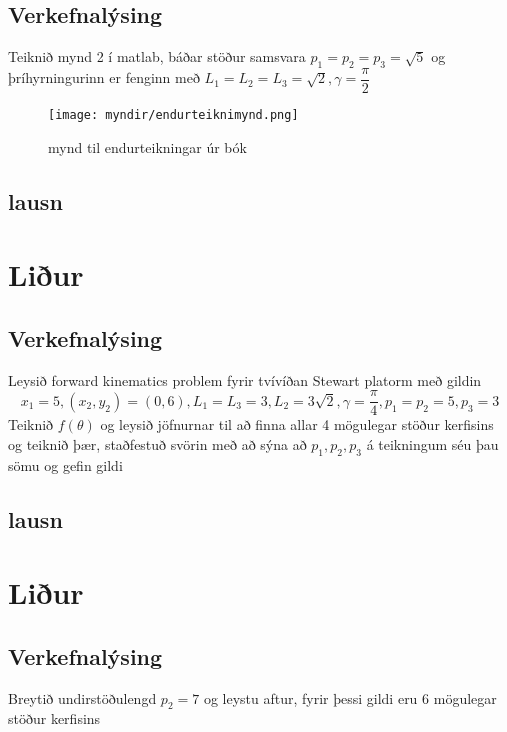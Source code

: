\documentclass[11pt]{article}   %
\numberwithin{equation}{section} %
\begin{document}
\subsection{Verkefnalýsing}
Teiknið mynd 2 í matlab, báðar stöður samsvara $p_1=p_2=p_3=\sqrt{5}$ og þríhyrningurinn er fenginn með $L_1=L_2=L_3=\sqrt{2},\gamma=\dfrac{\pi}{2}$

\begin{figure}[ht!]
\texttt{[image: myndir/endurteiknimynd.png]}
\centering
\caption{mynd til endurteikningar úr bók}
\label{hermi mynd}
\end{figure}

\subsection{lausn}


\section{Liður}%
\subsection{Verkefnalýsing}%
Leysið forward kinematics problem fyrir tvívíðan Stewart platorm með gildin
\begin{equation*}
    x_1 =5,(x_2,y_2)=(0,6), L_1 = L_3 =3, L_2 =3\sqrt{2}, \gamma =\dfrac{\pi}{4}, p_1=p_2=5, p_3=3
\end{equation*}
Teiknið $f(\theta)$ og leysið jöfnurnar til að finna allar 4 mögulegar stöður kerfisins og teiknið þær, staðfestuð svörin með að sýna að $p_1,p_2,p_3$ á teikningum séu þau sömu og gefin gildi
\subsection{lausn}


\section{Liður}%
\subsection{Verkefnalýsing}%
Breytið undirstöðulengd $p_2=7$ og leystu aftur, fyrir þessi gildi eru 6 mögulegar stöður kerfisins
\end{document}

